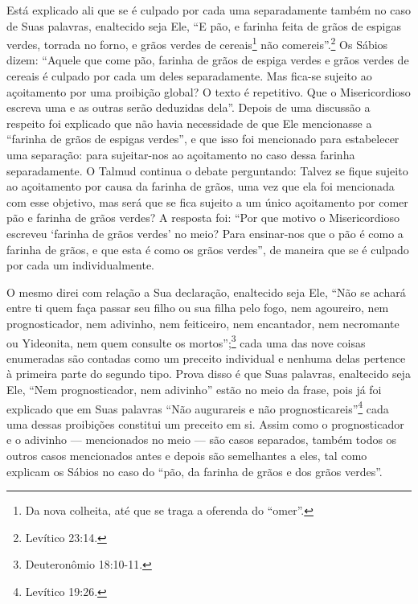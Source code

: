 Está explicado ali que se é culpado por cada uma separadamente também
no caso de Suas palavras, enaltecido seja Ele, ``E pão, e farinha feita
de grãos de espigas verdes, torrada no forno, e grãos verdes de
cereais\footnote{Da nova colheita, até que se traga a oferenda do ``omer''.} não comereis''.\footnote{Levítico 23:14.} Os Sábios
dizem: ``Aquele que come pão, farinha de grãos de espiga verdes e grãos
verdes de cereais é culpado por cada um deles separadamente. Mas
fica-se sujeito ao açoitamento por uma proibição global? O texto é
repetitivo. Que o Misericordioso escreva uma e as outras serão deduzidas
dela''. Depois de uma discussão a respeito foi explicado que não havia
necessidade de que Ele mencionasse a ``farinha de grãos de espigas
verdes'', e que isso foi mencionado para estabelecer uma separação: para
sujeitar-nos ao açoitamento no caso dessa farinha separadamente. O
Talmud continua o debate perguntando: Talvez se fique sujeito ao
açoitamento por causa da farinha de grãos, uma vez que ela foi
mencionada com esse objetivo, mas será que se fica sujeito a um único
açoitamento por comer pão e farinha de grãos verdes? A resposta foi:
``Por que motivo o Misericordioso escreveu `farinha de grãos verdes' no
meio? Para ensinar-nos que o pão é como a farinha de grãos, e que esta é
como os grãos verdes'', de maneira que se é culpado por cada um
individualmente.

O mesmo direi com relação a Sua declaração, enaltecido seja Ele, ``Não
se achará entre ti quem faça passar seu filho ou sua filha pelo fogo,
nem agoureiro, nem prognosticador, nem adivinho, nem feiticeiro, nem
encantador, nem necromante ou Yideonita, nem quem consulte os mortos'';\footnote{Deuteronômio 18:10-11.} cada uma das nove coisas enumeradas são
contadas como um preceito individual e nenhuma delas pertence à primeira
parte do segundo tipo. Prova disso é que Suas palavras, enaltecido seja
Ele, ``Nem prognosticador, nem adivinho'' estão no meio da frase, pois
já foi explicado que em Suas palavras ``Não augurareis e não
prognosticareis''\footnote{Levítico 19:26.} cada uma dessas proibições constitui
um preceito em si. Assim como o prognosticador e o adivinho ---
mencionados no meio --- são casos separados, também todos os outros
casos mencionados antes e depois são semelhantes a eles, tal como
explicam os Sábios no caso do ``pão, da farinha de grãos e dos grãos
verdes''.

